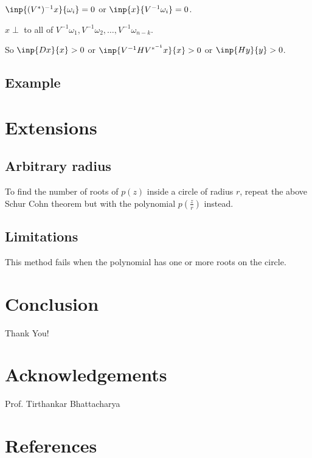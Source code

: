 \documentclass[twofold]{article}
\newcommand*\adj[1]{#1^*}
\theoremstyle{plain}
\theoremstyle{definition}
\theoremstyle{remark}
\begin{document}
\(\inp{(\adj{V})^{-1}x}{\omega_i} = 0\) or \( \inp{x}{V^{-1} \omega_i} = 0\).

\(x \perp\) to all of \(V^{-1}\omega_1,  V^{-1} \omega_2, \ldots , V^{-1} \omega_{n-k}\).

So \(\inp{Dx}{x} > 0\) or \(\inp{V^{-1} H V^{*^{-1}} x}{x} > 0\) or \(\inp{Hy}{y} > 0\).
\subsection{Example}

\section{Extensions}

\subsection{Arbitrary radius}
To find the number of roots of \(p(z)\) inside a circle of radius \(r\), repeat the above Schur Cohn theorem but with the polynomial \(p(\frac{z}{r})\) instead. 
\subsection{Limitations}
This method fails when the polynomial has one or more roots on the circle. 

\section{Conclusion}
Thank You!

\section{Acknowledgements}
Prof. Tirthankar Bhattacharya

\section{References}
\end{document}

